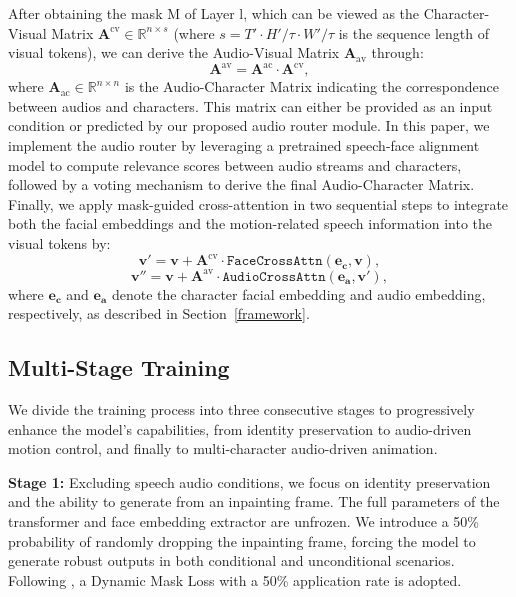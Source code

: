 After obtaining the mask M of Layer l, which can be viewed as the Character-Visual Matrix $\mathbf{A}^{\text{cv}} \in \mathbb{R}^{n \times s}$ (where $s = T' \cdot H'/\tau \cdot W'/\tau$ is the sequence length of visual tokens), we can derive the Audio-Visual Matrix $\mathbf{A}_{\text{av}}$ through:
\begin{equation}
\mathbf{A}^{\text{av}} = \mathbf{A}^{\text{ac}} \cdot \mathbf{A}^{\text{cv}},
\end{equation}
where $\mathbf{A}_{\text{ac}} \in \mathbb{R}^{n \times n}$ is the Audio-Character Matrix indicating the correspondence between audios and characters. 
This matrix can either be provided as an input condition or predicted by our proposed audio router module. In this paper, we implement the audio router by leveraging a pretrained speech-face alignment model \cite{wen_seeking_2021} to compute relevance scores between audio streams and characters, followed by a voting mechanism to derive the final Audio-Character Matrix. Finally, we apply mask-guided cross-attention in two sequential steps to integrate both the facial embeddings and the motion-related speech information into the visual tokens by:
\begin{equation}
    \mathbf{v'} = \mathbf{v} + \mathbf{A}^{\text{cv}} \cdot \texttt{FaceCrossAttn}(\mathbf{e_{c}}, \mathbf{v}),
\end{equation}
\begin{equation}
    \mathbf{v''} = \mathbf{v} + \mathbf{A}^{\text{av}} \cdot \texttt{AudioCrossAttn}(\mathbf{e_{a}}, \mathbf{v'}),
\end{equation}
where \(\mathbf{e_{c}}\) and \(\mathbf{e_{a}}\) denote the character facial embedding and audio embedding, respectively, as described in Section~\ref{framework}.


\subsection{Multi-Stage Training}
\label{subsec:training}
We divide the training process into three consecutive stages to progressively enhance the model's capabilities, from identity preservation to audio-driven motion control, and finally to multi-character audio-driven animation.

\textbf{Stage 1:} Excluding speech audio conditions, we focus on identity preservation and the ability to generate from an inpainting frame. The full parameters of the transformer and face embedding extractor are unfrozen. We introduce a 50\% probability of randomly dropping the inpainting frame, forcing the model to generate robust outputs in both conditional and unconditional scenarios. Following \cite{yuan_identity-preserving_2024}, a Dynamic Mask Loss with a 50\% application rate is adopted.

